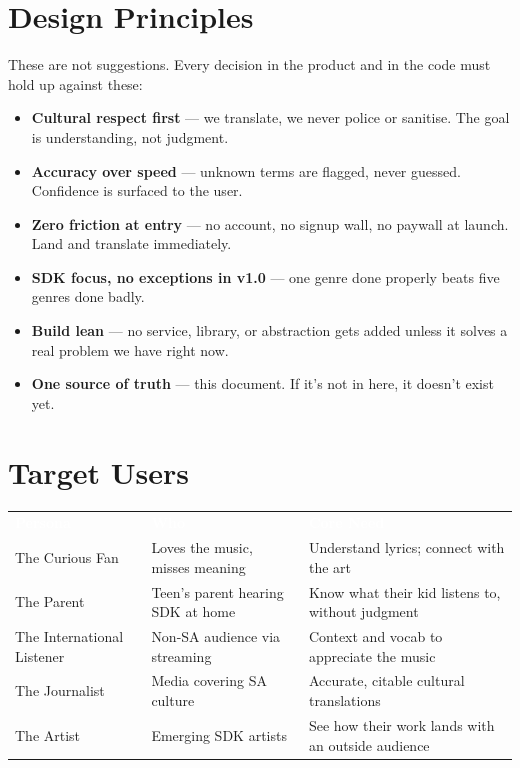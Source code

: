 \documentclass[12pt, a4paper]{article}
\begin{document}
\section{Design Principles}

These are not suggestions. Every decision in the product and in the code must
hold up against these:

\begin{tcolorbox}[prdbox]
\begin{itemize}
  \item \textbf{Cultural respect first} — we translate, we never police or
        sanitise. The goal is understanding, not judgment.
  \item \textbf{Accuracy over speed} — unknown terms are flagged, never
        guessed. Confidence is surfaced to the user.
  \item \textbf{Zero friction at entry} — no account, no signup wall, no
        paywall at launch. Land and translate immediately.
  \item \textbf{SDK focus, no exceptions in v1.0} — one genre done properly
        beats five genres done badly.
  \item \textbf{Build lean} — no service, library, or abstraction gets added
        unless it solves a real problem we have right now.
  \item \textbf{One source of truth} — this document. If it's not in here,
        it doesn't exist yet.
\end{itemize}
\end{tcolorbox}

\section{Target Users}

\renewcommand{\arraystretch}{1.5}
\begin{center}
\begin{tabular}{L{3cm} L{4cm} L{6.5cm}}
  \textcolor{white}{\textbf{Persona}} &
  \textcolor{white}{\textbf{Who}} &
  \textcolor{white}{\textbf{Core Need}} \\
  The Curious Fan & Loves the music, misses meaning &
  Understand lyrics; connect with the art \\
  The Parent & Teen's parent hearing SDK at home &
  Know what their kid listens to, without judgment \\
  The International Listener & Non-SA audience via streaming &
  Context and vocab to appreciate the music \\
  The Journalist & Media covering SA culture &
  Accurate, citable cultural translations \\
  The Artist & Emerging SDK artists &
  See how their work lands with an outside audience \\
\end{tabular}
\end{center}
\end{document}
